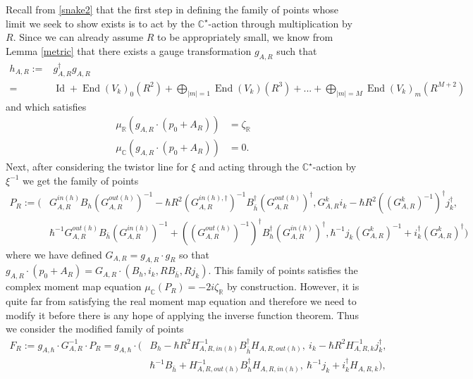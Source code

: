 \documentclass[12pt,oneside,reqno]{amsart}
\theoremstyle{definition}
\numberwithin{equation}{section}
\numberwithin{theorem}{section}
\newcommand{\R}{\mathbb{R}}
\newcommand{\C}{\mathbb{C}}
\newcommand{\End}{\operatorname{End}}
\newcommand{\Id}{\operatorname{Id}}
\begin{document}
Recall from \eqref{snake2} that the first step in defining the family of points whose limit we seek to show exists is to act by the $\C^{\star}$-action through multiplication by $R$. Since we can already assume $R$ to be appropriately small, we know from Lemma \ref{metric} that there exists a gauge transformation $g_{A,R}$ such that 
%
\begin{equation}
\begin{split}
h_{A,R}:=& g_{A,R}^{\dagger}g_{A,R}\\
=& \Id + \End(V_k)_0(R^2) + \bigoplus\limits_{|m|= 1}\End(V_k)(R^3)+ ... + \bigoplus\limits_{|m|= M} \End(V_k)_m(R^{M+2})
\end{split}
\end{equation}
%
and which satisfies
%
\begin{equation}
\begin{split}
\mu_{\R}(g_{A,R}\cdot(p_0+A_R)) &= \zeta_{\R}\\
\mu_{\C}(g_{A,R}\cdot(p_0+A_R)) &= 0.
\end{split}
\end{equation}
%
Next, after considering the twistor line for $\xi$ and acting through the $\C^{\star}$-action by $\xi^{-1}$ we get the family of points 
%
\begin{equation}
\begin{split}
P_R := (&G_{A,R}^{in(h)}B_h(G_{A,R}^{out(h)})^{-1} - \hbar R^2 (G_{A,R}^{in(h),\dagger})^{-1}B_{\bar h}^{\dagger}(G_{A,R}^{out(h)})^{\dagger}, G_{A,R}^k i_k - \hbar R^2((G_{A,R}^k)^{-1})^{\dagger}j_k^{\dagger}, \\ &\hbar^{-1}G_{A,R}^{out(h)}B_{\bar h}(G_{A,R}^{in(h)})^{-1} + ((G_{A,R}^{out(h)})^{-1})^{\dagger}B_h^{\dagger}(G_{A,R}^{in(h)})^{\dagger}, \hbar^{-1}j_k(G_{A,R}^k)^{-1} + i_k^{\dagger}(G_{A,R}^k)^{\dagger})
\end{split}
\end{equation}
%
where we have defined $G_{A,R} = g_{A,R}\cdot g_R$ so that $g_{A,R}\cdot (p_0+A_R) = G_{A,R}\cdot (B_h,i_k,RB_{\bar h},Rj_k)$.
This family of points satisfies the complex moment map equation $\mu_{\C}(P_R) = -2i\zeta_{\R}$ by construction. However, it is quite far from satisfying the real moment map equation and therefore we need to modify it before there is any hope of applying the inverse function theorem. Thus we consider the modified family of points 
%
\begin{equation}
\begin{split}
F_R:= g_{A,\hbar}\cdot G_{A,R}^{-1}\cdot P_R = g_{A,\hbar}\cdot(&B_h - \hbar R^2H_{A,R,in(h)}^{-1}B_{\bar h}^{\dagger}H_{A,R,out(h)}, ~i_k - \hbar R^2H_{A,R,k}^{-1}j_k^{\dagger},\\ &\hbar^{-1}B_{\bar h} + H_{A,R,out(h)}^{-1}B_h^{\dagger}H_{A,R,in(h)}, ~\hbar^{-1}j_k + i_k^{\dagger}H_{A,R,k}),
\end{split}
\end{equation}
\end{document}
